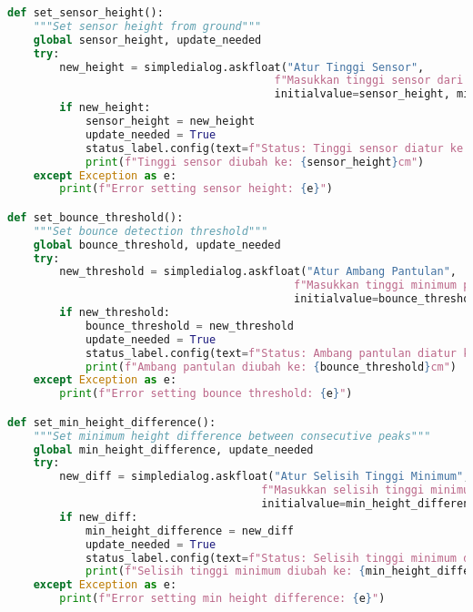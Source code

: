 \begin{itemize}
\begin{scriptsize}
\begin{lstlisting}[language=python]
def set_sensor_height():
    """Set sensor height from ground"""
    global sensor_height, update_needed
    try:
        new_height = simpledialog.askfloat("Atur Tinggi Sensor", 
                                         f"Masukkan tinggi sensor dari lantai (cm):\nSaat ini: {sensor_height}cm",
                                         initialvalue=sensor_height, minvalue=10, maxvalue=200)
        if new_height:
            sensor_height = new_height
            update_needed = True
            status_label.config(text=f"Status: Tinggi sensor diatur ke {sensor_height}cm", fg="blue")
            print(f"Tinggi sensor diubah ke: {sensor_height}cm")
    except Exception as e:
        print(f"Error setting sensor height: {e}")

def set_bounce_threshold():
    """Set bounce detection threshold"""
    global bounce_threshold, update_needed
    try:
        new_threshold = simpledialog.askfloat("Atur Ambang Pantulan", 
                                            f"Masukkan tinggi minimum pantulan (cm):\nSaat ini: {bounce_threshold}cm",
                                            initialvalue=bounce_threshold, minvalue=1.0, maxvalue=50.0)
        if new_threshold:
            bounce_threshold = new_threshold
            update_needed = True
            status_label.config(text=f"Status: Ambang pantulan diatur ke {bounce_threshold}cm", fg="blue")
            print(f"Ambang pantulan diubah ke: {bounce_threshold}cm")
    except Exception as e:
        print(f"Error setting bounce threshold: {e}")

def set_min_height_difference():
    """Set minimum height difference between consecutive peaks"""
    global min_height_difference, update_needed
    try:
        new_diff = simpledialog.askfloat("Atur Selisih Tinggi Minimum", 
                                       f"Masukkan selisih tinggi minimum antar puncak (cm):\nSaat ini: {min_height_difference}cm",
                                       initialvalue=min_height_difference, minvalue=0.1, maxvalue=10.0)
        if new_diff:
            min_height_difference = new_diff
            update_needed = True
            status_label.config(text=f"Status: Selisih tinggi minimum diatur ke {min_height_difference}cm", fg="blue")
            print(f"Selisih tinggi minimum diubah ke: {min_height_difference}cm")
    except Exception as e:
        print(f"Error setting min height difference: {e}")


\end{lstlisting}
\end{scriptsize}
\end{itemize}
